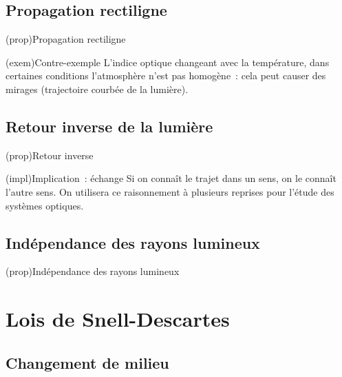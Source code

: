 \documentclass[../../main/main.tex]{subfiles}
\begin{document}
\subsection{Propagation rectiligne}

\begin{tcb}[bld, label=prop:prop_rect](prop){Propagation rectiligne}
\end{tcb}
\begin{tcb}(exem){Contre-exemple}
	L'indice optique changeant avec la température, dans certaines
	conditions l'atmosphère n'est pas homogène~: cela peut causer des
	mirages (trajectoire courbée de la lumière).
\end{tcb}

\subsection{Retour inverse de la lumière}

\begin{tcb}[label=prop:ret_inv](prop){Retour inverse}
\end{tcb}
\begin{tcb}[label=impl:ret_inv](impl){Implication~: échange}
	Si on connaît le trajet dans un sens, on le connaît l'autre sens. On
	utilisera ce raisonnement à plusieurs reprises pour l'étude des systèmes
	optiques.
\end{tcb}

\subsection{Indépendance des rayons lumineux}

\begin{tcb}[label=prop:ind_lum](prop){Indépendance des rayons lumineux}
\end{tcb}

\section{Lois de Snell-Descartes}
\subsection{Changement de milieu}
\end{document}

